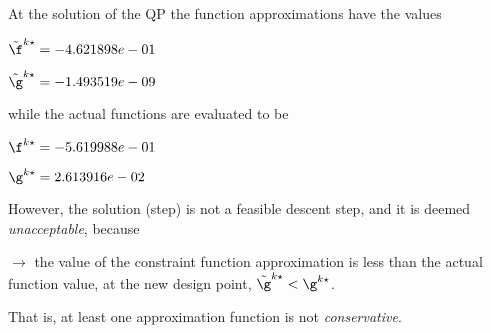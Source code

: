 At the solution of the QP the function approximations have the values

$\tilde \f^{k\star} = -4.621898e-01$

$\tilde \g^{k\star} = -1.493519e-09$

\bigskip
while the actual functions are evaluated to be

$\f^{k\star} = -5.619988e-01$

$\g^{k\star} =  2.613916e-02$

\bigskip
 However, the solution (step)                         is not a feasible descent step, and it is deemed                         \emph{unacceptable}, because 
 


 $\to$ the value of the constraint function                             approximation is less than the actual function value, at                             the new design point, $\tilde {\g}^{k\star} < {\g}^{k\star}$.

 \bigskip 

 That is, at least one approximation                         function is not \emph{conservative}.
